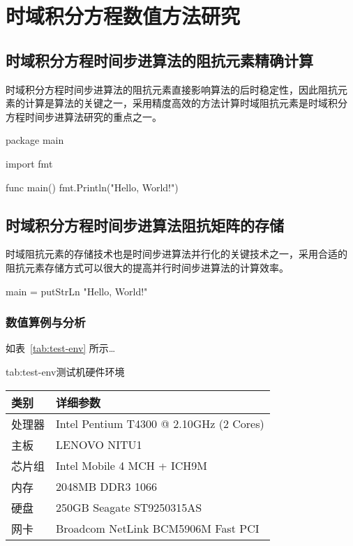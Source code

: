 \chapter{时域积分方程数值方法研究}

\section{时域积分方程时间步进算法的阻抗元素精确计算}

时域积分方程时间步进算法的阻抗元素直接影响算法的后时稳定性，因此阻抗元
素的计算是算法的关键之一，采用精度高效的方法计算时域阻抗元素是时域积分
方程时间步进算法研究的重点之一。

\begin{Code}
  package main

  import fmt

  func main() {
    fmt.Println("Hello, World!")
  }
\end{Code}

\section{时域积分方程时间步进算法阻抗矩阵的存储}

时域阻抗元素的存储技术也是时间步进算法并行化的关键技术之一，采用合适的
阻抗元素存储方式可以很大的提高并行时间步进算法的计算效率。

\begin{CodeLines}
  main = putStrLn "Hello, World!"
\end{CodeLines}

\subsection{数值算例与分析}

如表~\ref{tab:test-env} 所示\ldots

\begin{Table}{tab:test-env}{测试机硬件环境}
\begin{tabularx}{0.6\textwidth}{l >{\centering\arraybackslash}X}
  \hline
  类别 & 详细参数 \\
  \hline
  处理器 & Intel Pentium T4300 @ 2.10GHz (2 Cores) \\
  主板 & LENOVO NITU1 \\
  芯片组 & Intel Mobile 4 MCH + ICH9M \\
  内存 & 2048MB DDR3 1066\\
  硬盘 & 250GB Seagate ST9250315AS \\
  网卡 & Broadcom NetLink BCM5906M Fast PCI\\
  \hline
\end{tabularx}
\end{Table}
